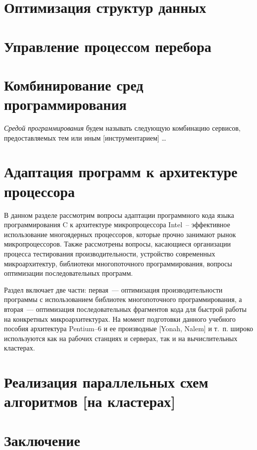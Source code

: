 \documentclass[14pt, a4paper, openany, twoside, final]{extbook} %
\newcommand{\e}[2][fcolor]{\textcolor{pcolor}{[}\textcolor{#1}{#2}\textcolor{pcolor}{]}}
\begin{document}
\chapter{Оптимизация структур данных}

\chapter{Управление процессом перебора}

\chapter{Комбинирование сред программирования}

\emph{Средой программирования} будем называть следующую комбинацию сервисов, предоставляемых тем или иным \e{инструментарием} \ldots{}

\chapter{Адаптация программ к архитектуре процессора}
\label{cha:CPU}

В данном разделе рассмотрим вопросы адаптации программного кода языка программирования C к архитектуре микропроцессора Intel~-- эффективное использование многоядерных процессоров, которые прочно занимают рынок микропроцессоров.  Также рассмотрены вопросы, касающиеся организации процесса тестирования производительности, устройство современных микроархитектур, библиотеки многопоточного программирования, вопросы оптимизации последовательных программ.

Раздел включает две части: первая~--- оптимизация производительности программы с использованием библиотек многопоточного программирования, а вторая~--- оптимизация последовательных фрагментов кода для быстрой работы на конкретных микроархитектурах.   На момент подготовки данного учебного пособия архитектура Pentium--6 и ее производные \e{Yonah, Nalem} и т.~п. широко используются как на рабочих станциях и серверах, так и на вычислительных кластерах.



\chapter{Реализация параллельных схем алгоритмов \e{на кластерах}}

\chapter*{Заключение}
\end{document}
